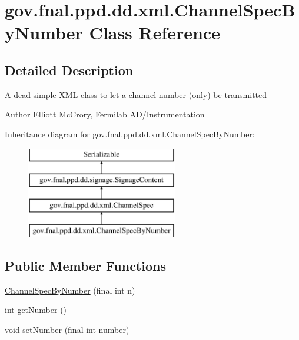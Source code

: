 \hypertarget{classgov_1_1fnal_1_1ppd_1_1dd_1_1xml_1_1ChannelSpecByNumber}{\section{gov.\-fnal.\-ppd.\-dd.\-xml.\-Channel\-Spec\-By\-Number Class Reference}
\label{classgov_1_1fnal_1_1ppd_1_1dd_1_1xml_1_1ChannelSpecByNumber}
}


\subsection{Detailed Description}
A dead-\/simple X\-M\-L class to let a channel number (only) be transmitted

\begin{DoxyAuthor}{Author}
Elliott Mc\-Crory, Fermilab A\-D/\-Instrumentation 
\end{DoxyAuthor}
Inheritance diagram for gov.\-fnal.\-ppd.\-dd.\-xml.\-Channel\-Spec\-By\-Number\-:\begin{figure}[H]
\begin{center}
\leavevmode
\includegraphics[height=4.000000cm]{classgov_1_1fnal_1_1ppd_1_1dd_1_1xml_1_1ChannelSpecByNumber}
\end{center}
\end{figure}
\subsection*{Public Member Functions}
\begin{DoxyCompactItemize}
\item 
\hyperlink{classgov_1_1fnal_1_1ppd_1_1dd_1_1xml_1_1ChannelSpecByNumber_ac165be7f17b3d006e49e48766b908abb}{Channel\-Spec\-By\-Number} (final int n)
\item 
int \hyperlink{classgov_1_1fnal_1_1ppd_1_1dd_1_1xml_1_1ChannelSpecByNumber_a48ec6af06f26b88ca832af86472c3588}{get\-Number} ()
\item 
void \hyperlink{classgov_1_1fnal_1_1ppd_1_1dd_1_1xml_1_1ChannelSpecByNumber_a8a1b1699955fa0a62de6e20ca1549445}{set\-Number} (final int number)
\end{DoxyCompactItemize}
